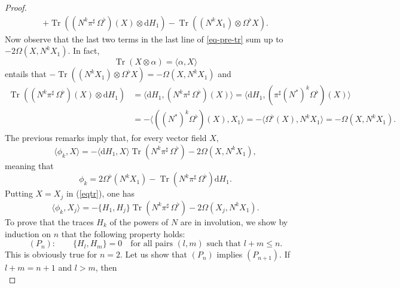 \documentclass[12pt]{article}
\def\d{{\mathrm d}}
\def\parpo#1#2{\{#1,#2\}}
\newcommand{\brke}[2]{{{\langle #1,#2\rangle}}}
\def\Tr{\operatorname{Tr}}
\begin{document}
\begin{proof}
\begin{equation}
\begin{split}
+%
\Tr\left(({N}^k\pi^\sharp\,\Omega^\flat)(X)\otimes \d H_1\right)
-%
\Tr\left(({N}^k X_1)\otimes \Omega^\flat X\right).
\end{split}
\end{equation}
Now observe that the last two terms in the last line of \eqref{eq-pre-tr} sum up to $-2\Omega(X,N^kX_1)$. In fact,
\begin{equation}
\Tr(X\otimes\alpha)=\brke{\alpha}{X}\label{eq:identi} 
\end{equation} 
entails that $-%
\Tr\left(({N}^k X_1)\otimes \Omega^\flat X\right)=-\Omega(X,N^kX_1)$ and
\begin{equation}
\label{eqtr-b}
\begin{split}
\Tr\left(({N}^k\pi^\sharp\,
\Omega^\flat)(X)\otimes \d H_1\right)
&=\brke{\d H_1}{({N}^k\pi^\sharp\,
\Omega^\flat)(X)}
=\brke{\d H_1}{(\pi^\sharp ({N}^*)^k \Omega^\flat)(X)}\\
&=-\brke{(({N}^*)^k \Omega^\flat)(X)}{X_1}
=-\brke{\Omega^\flat(X)}{{N}^k X_1}
=-\Omega(X,{N}^k X_1).
\end{split}
\end{equation}
The previous remarks imply that, for every vector field $X$,
\begin{equation}
\label{eqtr}
\brke{\phi_k}{X}=%
-\langle \d H_1,X\rangle\Tr\left({N}^k\pi^\sharp\,\Omega^\flat\right)-2\Omega(X,{N}^k X_1),
\end{equation}
meaning that
\begin{equation}
\label{eq-phi_k}
\phi_k=2\Omega^\flat({N}^k X_1)-\Tr\left({N}^k\pi^\sharp\,\Omega^\flat\right)\d H_1.
\end{equation}
Putting %
$X=X_j$ in (\ref{eqtr}), one has
\begin{equation}
\label{eqtr2}
\brke{\phi_k}{X_j}=-\parpo{H_1}{H_j}\Tr\left({N}^k\pi^\sharp\,\Omega^\flat\right)-2\Omega(X_j,{N}^k X_1).
\end{equation}
To prove that the traces $H_k$ of the powers of $N$ are in involution, we show by induction on $n$ 
that the following property holds:
\begin{equation*}
(P_n):\qquad\parpo{H_l}{H_m}=0\quad\mbox{for all pairs $(l,m)$ such that $l+m\le n$.}
\end{equation*}
This is obviously true for $n=2$. Let us show that $(P_n)$ implies $(P_{n+1})$. If $l+m=n+1$ and $l>m$, then 
\begin{equation}

\end{equation}
\end{proof}
\end{document}
